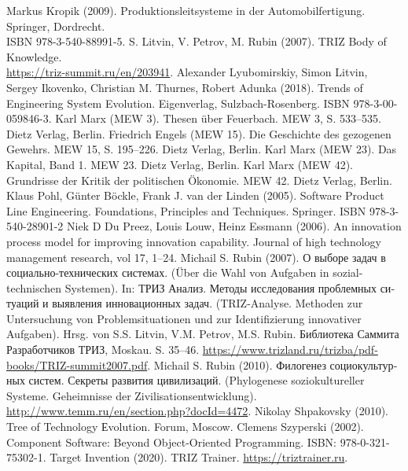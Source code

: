 \documentclass[11pt,a4paper]{article}
\begin{document}
\begin{thebibliography}{xxx}
 Markus Kropik (2009). Produktionsleitsysteme in der
    Automobilfertigung. Springer, Dordrecht.\\ ISBN 978-3-540-88991-5.
 S. Litvin, V. Petrov, M. Rubin (2007). TRIZ Body of
  Knowledge. \\ \url{https://triz-summit.ru/en/203941}.
 Alexander Lyubomirskiy, Simon Litvin, Sergey Ikovenko,
  Christian M. Thurnes, Robert Adunka (2018). Trends of Engineering System
  Evolution. Eigenverlag, Sulzbach-Rosenberg.  ISBN 978-3-00-059846-3.
 Karl Marx (MEW 3).  Thesen über Feuerbach. MEW 3, S. 533--535.
  Dietz Verlag, Berlin.
 Friedrich Engels (MEW 15). Die Geschichte des gezogenen
  Gewehrs.  MEW 15, S. 195--226. Dietz Verlag, Berlin.
 Karl Marx (MEW 23). Das Kapital, Band 1. MEW 23. Dietz Verlag,
  Berlin.
 Karl Marx (MEW 42). Grundrisse der Kritik der politischen
  Ökonomie.  MEW 42. Dietz Verlag, Berlin.
 Klaus Pohl, Günter Böckle, Frank J. van der Linden (2005).
  Software Product Line Engineering. Foundations, Principles and Techniques.
  Springer. ISBN 978-3-540-28901-2
 Niek D Du Preez, Louis Louw, Heinz Essmann (2006). An
  innovation process model for improving innovation capability.  Journal of
  high technology management research, vol 17, 1--24.
 Michail S. Rubin (2007). \foreignlanguage{russian}{О
  выборе задач в социально-технических системах}. (Über die Wahl von Aufgaben
  in sozial-technischen Systemen). In: \foreignlanguage{russian}{ТРИЗ Анализ.
    Методы исследования проблемных ситуаций и выявления инновационных
    задач}. (TRIZ-Analyse. Methoden zur Untersuchung von Problemsituationen
  und zur Identifizierung innovativer Aufgaben). Hrsg. von S.S. Litvin,
  V.M. Petrov, M.S. Rubin. \foreignlanguage{russian}{Библиотека Саммита
    Разработчиков ТРИЗ}, Moskau. S. 35--46.
  \url{https://www.trizland.ru/trizba/pdf-books/TRIZ-summit2007.pdf}.
 Michail S. Rubin (2010).
  \foreignlanguage{russian}{Филогенез социокультурных систем. Секреты развития
    цивилизаций}.  (Phylogenese soziokultureller Systeme. Geheimnisse der
  Zivilisationsentwicklung).
  \url{http://www.temm.ru/en/section.php?docId=4472}.
 Nikolay Shpakovsky (2010).  Tree of Technology
  Еvolution. Forum, Moscow.
 Clemens Szyperski (2002). Component Software: Beyond
  Object-Oriented Programming. ISBN: 978-0-321-75302-1.
 Target Invention (2020). TRIZ Trainer.
  \url{https://triztrainer.ru}.

\end{thebibliography}
\end{document}
